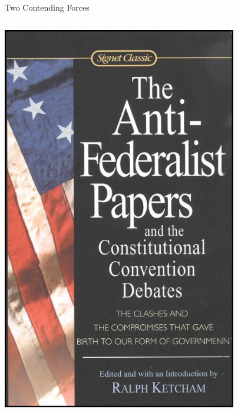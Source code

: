 \begin{frame}{Two Contending Forces}
\begin{columns}[onlytextwidth]
            \includegraphics[width=0.8\textwidth]{img/anti-federalist.jpg} \\
    \end{columns}
\end{frame}

